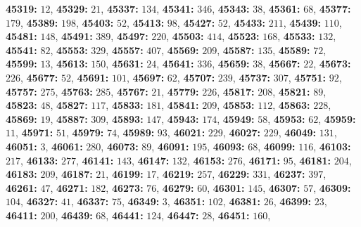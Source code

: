 \textsf{\bfseries 45319:} $12$, \textsf{\bfseries 45329:} $21$, \textsf{\bfseries 45337:} $134$, \textsf{\bfseries 45341:} $346$, \textsf{\bfseries 45343:} $38$, \textsf{\bfseries 45361:} $68$, \textsf{\bfseries 45377:} $179$, \textsf{\bfseries 45389:} $198$, \textsf{\bfseries 45403:} $52$, \textsf{\bfseries 45413:} $98$, \textsf{\bfseries 45427:} $52$, \textsf{\bfseries 45433:} $211$, \textsf{\bfseries 45439:} $110$, \textsf{\bfseries 45481:} $148$, \textsf{\bfseries 45491:} $389$, \textsf{\bfseries 45497:} $220$, \textsf{\bfseries 45503:} $414$, \textsf{\bfseries 45523:} $168$, \textsf{\bfseries 45533:} $132$, \textsf{\bfseries 45541:} $82$, \textsf{\bfseries 45553:} $329$, \textsf{\bfseries 45557:} $407$, \textsf{\bfseries 45569:} $209$, \textsf{\bfseries 45587:} $135$, \textsf{\bfseries 45589:} $72$, \textsf{\bfseries 45599:} $13$, \textsf{\bfseries 45613:} $150$, \textsf{\bfseries 45631:} $24$, \textsf{\bfseries 45641:} $336$, \textsf{\bfseries 45659:} $38$, \textsf{\bfseries 45667:} $22$, \textsf{\bfseries 45673:} $226$, \textsf{\bfseries 45677:} $52$, \textsf{\bfseries 45691:} $101$, \textsf{\bfseries 45697:} $62$, \textsf{\bfseries 45707:} $239$, \textsf{\bfseries 45737:} $307$, \textsf{\bfseries 45751:} $92$, \textsf{\bfseries 45757:} $275$, \textsf{\bfseries 45763:} $285$, \textsf{\bfseries 45767:} $21$, \textsf{\bfseries 45779:} $226$, \textsf{\bfseries 45817:} $208$, \textsf{\bfseries 45821:} $89$, \textsf{\bfseries 45823:} $48$, \textsf{\bfseries 45827:} $117$, \textsf{\bfseries 45833:} $181$, \textsf{\bfseries 45841:} $209$, \textsf{\bfseries 45853:} $112$, \textsf{\bfseries 45863:} $228$, \textsf{\bfseries 45869:} $19$, \textsf{\bfseries 45887:} $309$, \textsf{\bfseries 45893:} $147$, \textsf{\bfseries 45943:} $174$, \textsf{\bfseries 45949:} $58$, \textsf{\bfseries 45953:} $62$, \textsf{\bfseries 45959:} $11$, \textsf{\bfseries 45971:} $51$, \textsf{\bfseries 45979:} $74$, \textsf{\bfseries 45989:} $93$, \textsf{\bfseries 46021:} $229$, \textsf{\bfseries 46027:} $229$, \textsf{\bfseries 46049:} $131$, \textsf{\bfseries 46051:} $3$, \textsf{\bfseries 46061:} $280$, \textsf{\bfseries 46073:} $89$, \textsf{\bfseries 46091:} $195$, \textsf{\bfseries 46093:} $68$, \textsf{\bfseries 46099:} $116$, \textsf{\bfseries 46103:} $217$, \textsf{\bfseries 46133:} $277$, \textsf{\bfseries 46141:} $143$, \textsf{\bfseries 46147:} $132$, \textsf{\bfseries 46153:} $276$, \textsf{\bfseries 46171:} $95$, \textsf{\bfseries 46181:} $204$, \textsf{\bfseries 46183:} $209$, \textsf{\bfseries 46187:} $21$, \textsf{\bfseries 46199:} $17$, \textsf{\bfseries 46219:} $257$, \textsf{\bfseries 46229:} $331$, \textsf{\bfseries 46237:} $397$, \textsf{\bfseries 46261:} $47$, \textsf{\bfseries 46271:} $182$, \textsf{\bfseries 46273:} $76$, \textsf{\bfseries 46279:} $60$, \textsf{\bfseries 46301:} $145$, \textsf{\bfseries 46307:} $57$, \textsf{\bfseries 46309:} $104$, \textsf{\bfseries 46327:} $41$, \textsf{\bfseries 46337:} $75$, \textsf{\bfseries 46349:} $3$, \textsf{\bfseries 46351:} $102$, \textsf{\bfseries 46381:} $26$, \textsf{\bfseries 46399:} $23$, \textsf{\bfseries 46411:} $200$, \textsf{\bfseries 46439:} $68$, \textsf{\bfseries 46441:} $124$, \textsf{\bfseries 46447:} $28$, \textsf{\bfseries 46451:} $160$, 
